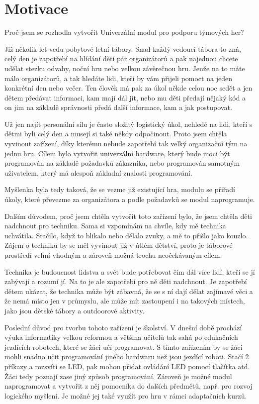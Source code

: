 \chapter{Motivace}
Proč jsem se rozhodla vytvořit Univerzální modul pro podporu týmových her? 

Již několik let vedu pobytové letní tábory. Snad každý vedoucí tábora to zná, celý den je zapotřebí na hlídání dětí pár organizátorů 
a pak najednou chcete udělat stezku odvahy, noční hru nebo velkou závěrečnou hru. Jenže na to máte málo organizátorů, a tak hledáte lidi, 
kteří by vám přijeli pomoct na jeden konkrétní den nebo večer. Ten člověk má pak za úkol někde celou noc sedět a jen dětem předávat 
informaci, kam mají dál jít, nebo mu děti předají nějaký kód a on jim na základě správnosti předá další informace, kam a jak postupovat. 

Už jen najít personální sílu je často složitý logistický úkol, nehledě na lidi, kteří s dětmi byli celý den a musejí si také někdy 
odpočinout. Proto jsem chtěla vyvinout zařízení, díky kterému nebude zapotřebí tak velký organizační tým na jednu hru. Cílem bylo vytvořit 
univerzální hardware, který bude moci být programován na základě požadavků zákazníka, nebo programován samotným uživatelem, který má alespoň 
základní znalosti programování. 

Myšlenka byla tedy taková, že se vezme již existující hra, modulu se přiřadí úkoly, které převezme za organizátora a podle požadavků se 
modul naprogramuje. 

Dalším důvodem, proč jsem chtěla vytvořit toto zařízení bylo, že jsem chtěla děti nadchnout pro techniku. Sama si vzpomínám na chvíle, kdy
mě technika uchvátila. Stačilo, když to blikalo nebo dělalo zvuky, a mě to přišlo jako kouzlo. Zájem o techniku by se měl vyvinout již v útlém 
dětství, proto je táborové prostředí velmi vhodným a zároveň možná trochu neočekávaným cílem. 

Technika je budoucnost lidstva a svět bude potřebovat čím dál více lidí, kteří se jí zabývají a rozumí jí. Na to je ale zapotřebí pro ně děti 
nadchnout. Je zapotřebí dětem ukázat, že technika může být zábavná, že se s ní dají dělat zajímavé věci a že nemá místo jen v průmyslu, ale může 
mít zastoupení i na takových místech, jako jsou dětské tábory a outdoorové aktivity.  

Poslední důvod pro tvorbu tohoto zařízení je školství. V dnešní době prochází výuka informatiky velkou reformou a většina učitelů tak sahá po 
edukačních jezdících robotech, které se žáci učí programovat. S tímto zařízením by se žáci mohli snadno učit programování jiného hardwaru než jsou 
jezdící roboti. 
Stačí 2 příkazy a rozsvítí se LED, pak mohou přidat ovládání LED pomocí tlačítka atd. Žáci tedy poznají zase jiný způsob programování.
Zároveň je možné modul naprogramovat a vytvořit z něj pomocníka do dalších předmětů, např. pro rozvoj 
logického myšlení. Je možné jej také využít pro hru v rámci adaptačních kurzů. 

